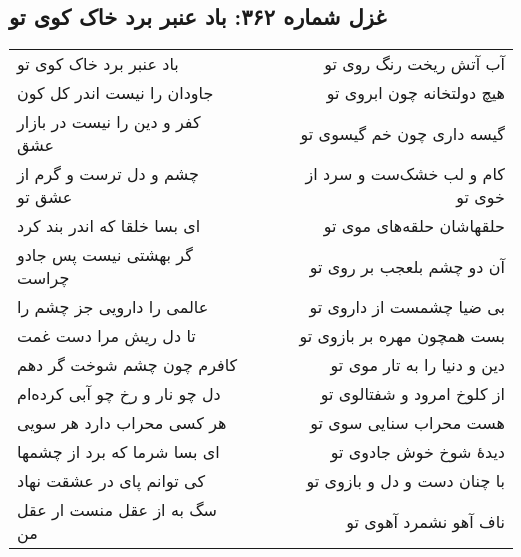 \begin{center}
\section*{غزل شماره ۳۶۲: باد عنبر برد خاک کوی تو}
\label{sec:362}
\begin{longtable}{l p{0.5cm} r}
باد عنبر برد خاک کوی تو
&&
آب آتش ریخت رنگ روی تو
\\
جاودان را نیست اندر کل کون
&&
هیچ دولتخانه چون ابروی تو
\\
کفر و دین را نیست در بازار عشق
&&
گیسه داری چون خم گیسوی تو
\\
چشم و دل ترست و گرم از عشق تو
&&
کام و لب خشک‌ست و سرد از خوی تو
\\
ای بسا خلقا که اندر بند کرد
&&
حلقهاشان حلقه‌های موی تو
\\
گر بهشتی نیست پس جادو چراست
&&
آن دو چشم بلعجب بر روی تو
\\
عالمی را دارویی جز چشم را
&&
بی ضیا چشمست از داروی تو
\\
تا دل ریش مرا دست غمت
&&
بست همچون مهره بر بازوی تو
\\
کافرم چون چشم شوخت گر دهم
&&
دین و دنیا را به تار موی تو
\\
دل چو نار و رخ چو آبی کرده‌ام
&&
از کلوخ امرود و شفتالوی تو
\\
هر کسی محراب دارد هر سویی
&&
هست محراب سنایی سوی تو
\\
ای بسا شرما که برد از چشمها
&&
دیدهٔ شوخ خوش جادوی تو
\\
کی توانم پای در عشقت نهاد
&&
با چنان دست و دل و بازوی تو
\\
سگ به از عقل منست ار عقل من
&&
ناف آهو نشمرد آهوی تو
\\
\end{longtable}
\end{center}
